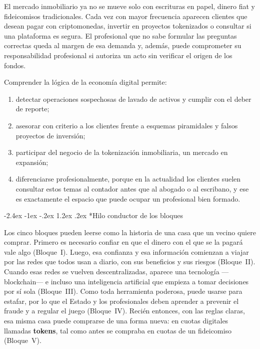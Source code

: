 \documentclass[12pt,oneside]{book}
\makeatletter
\renewcommand\section{\@startsection{section}{1}{\z@}%
  {-2.4ex \@plus -1ex \@minus -.2ex}%
  {1.2ex \@plus .2ex}%
  {\normalfont\Large\bfseries\color{blue!50!black}}}
\makeatother
\begin{document}
El mercado inmobiliario ya no se mueve solo con escrituras en papel, dinero fiat y fideicomisos tradicionales. Cada vez con mayor frecuencia aparecen clientes que desean pagar con criptomonedas, invertir en proyectos tokenizados o consultar si una plataforma es segura. El profesional que no sabe formular las preguntas correctas queda al margen de esa demanda y, además, puede comprometer su responsabilidad profesional si autoriza un acto sin verificar el origen de los fondos.

Comprender la lógica de la economía digital permite:

\begin{enumerate}
    \item detectar operaciones sospechosas de lavado de activos y cumplir con el deber de reporte;
    \item asesorar con criterio a los clientes frente a esquemas piramidales y falsos proyectos de inversión;
    \item participar del negocio de la tokenización inmobiliaria, un mercado en expansión;
    \item diferenciarse profesionalmente, porque en la actualidad los clientes suelen consultar estos temas al contador antes que al abogado o al escribano, y ese es exactamente el espacio que puede ocupar un profesional bien formado.
\end{enumerate}

\section*{Hilo conductor de los bloques}

Los cinco bloques pueden leerse como la historia de una casa que un vecino quiere comprar. Primero es necesario confiar en que el dinero con el que se la pagará vale algo (Bloque~I). Luego, esa confianza y esa información comienzan a viajar por las redes que todos usan a diario, con sus beneficios y sus riesgos (Bloque~II). Cuando esas redes se vuelven descentralizadas, aparece una tecnología ---blockchain--- e incluso una inteligencia artificial que empieza a tomar decisiones por sí sola (Bloque~III). Como toda herramienta poderosa, puede usarse para estafar, por lo que el Estado y los profesionales deben aprender a prevenir el fraude y a regular el juego (Bloque~IV). Recién entonces, con las reglas claras, esa misma casa puede comprarse de una forma nueva: en cuotas digitales llamadas \textbf{tokens}, tal como antes se compraba en cuotas de un fideicomiso (Bloque~V).
\end{document}
